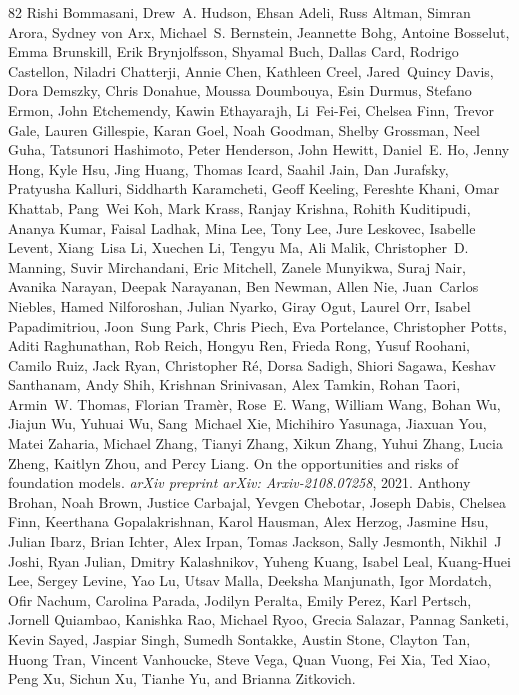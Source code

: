 \documentclass{article}
\begin{document}
\begin{thebibliography}{82}
Rishi Bommasani, Drew~A. Hudson, Ehsan Adeli, Russ Altman, Simran Arora, Sydney von Arx, Michael~S. Bernstein, Jeannette Bohg, Antoine Bosselut, Emma Brunskill, Erik Brynjolfsson, Shyamal Buch, Dallas Card, Rodrigo Castellon, Niladri Chatterji, Annie Chen, Kathleen Creel, Jared~Quincy Davis, Dora Demszky, Chris Donahue, Moussa Doumbouya, Esin Durmus, Stefano Ermon, John Etchemendy, Kawin Ethayarajh, Li~Fei-Fei, Chelsea Finn, Trevor Gale, Lauren Gillespie, Karan Goel, Noah Goodman, Shelby Grossman, Neel Guha, Tatsunori Hashimoto, Peter Henderson, John Hewitt, Daniel~E. Ho, Jenny Hong, Kyle Hsu, Jing Huang, Thomas Icard, Saahil Jain, Dan Jurafsky, Pratyusha Kalluri, Siddharth Karamcheti, Geoff Keeling, Fereshte Khani, Omar Khattab, Pang~Wei Koh, Mark Krass, Ranjay Krishna, Rohith Kuditipudi, Ananya Kumar, Faisal Ladhak, Mina Lee, Tony Lee, Jure Leskovec, Isabelle Levent, Xiang~Lisa Li, Xuechen Li, Tengyu Ma, Ali Malik, Christopher~D. Manning, Suvir Mirchandani, Eric Mitchell, Zanele Munyikwa, Suraj Nair,
  Avanika Narayan, Deepak Narayanan, Ben Newman, Allen Nie, Juan~Carlos Niebles, Hamed Nilforoshan, Julian Nyarko, Giray Ogut, Laurel Orr, Isabel Papadimitriou, Joon~Sung Park, Chris Piech, Eva Portelance, Christopher Potts, Aditi Raghunathan, Rob Reich, Hongyu Ren, Frieda Rong, Yusuf Roohani, Camilo Ruiz, Jack Ryan, Christopher Ré, Dorsa Sadigh, Shiori Sagawa, Keshav Santhanam, Andy Shih, Krishnan Srinivasan, Alex Tamkin, Rohan Taori, Armin~W. Thomas, Florian Tramèr, Rose~E. Wang, William Wang, Bohan Wu, Jiajun Wu, Yuhuai Wu, Sang~Michael Xie, Michihiro Yasunaga, Jiaxuan You, Matei Zaharia, Michael Zhang, Tianyi Zhang, Xikun Zhang, Yuhui Zhang, Lucia Zheng, Kaitlyn Zhou, and Percy Liang.
\newblock On the opportunities and risks of foundation models.
\newblock \emph{arXiv preprint arXiv: Arxiv-2108.07258}, 2021.
Anthony Brohan, Noah Brown, Justice Carbajal, Yevgen Chebotar, Joseph Dabis, Chelsea Finn, Keerthana Gopalakrishnan, Karol Hausman, Alex Herzog, Jasmine Hsu, Julian Ibarz, Brian Ichter, Alex Irpan, Tomas Jackson, Sally Jesmonth, Nikhil~J Joshi, Ryan Julian, Dmitry Kalashnikov, Yuheng Kuang, Isabel Leal, Kuang-Huei Lee, Sergey Levine, Yao Lu, Utsav Malla, Deeksha Manjunath, Igor Mordatch, Ofir Nachum, Carolina Parada, Jodilyn Peralta, Emily Perez, Karl Pertsch, Jornell Quiambao, Kanishka Rao, Michael Ryoo, Grecia Salazar, Pannag Sanketi, Kevin Sayed, Jaspiar Singh, Sumedh Sontakke, Austin Stone, Clayton Tan, Huong Tran, Vincent Vanhoucke, Steve Vega, Quan Vuong, Fei Xia, Ted Xiao, Peng Xu, Sichun Xu, Tianhe Yu, and Brianna Zitkovich.

\end{thebibliography}
\end{document}
